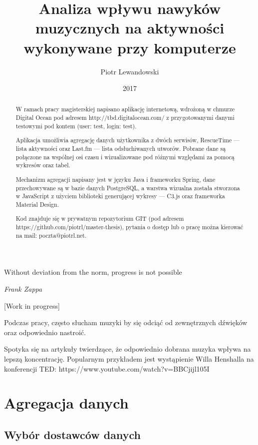 \documentclass[brudnopis]{xmgr}
\author   {Piotr Lewandowski}
\title    {Analiza wpływu nawyków muzycznych na aktywności wykonywane przy komputerze}
\date     {2017}
\begin{document}
\begin{abstract}
    W ramach pracy magisterskiej napisano aplikację internetową,
    wdrożoną w chmurze Digital Ocean pod adresem http://tbd.digitalocean.com/
    z przygotowanymi danymi testowymi pod kontem (user: test, login: test).

    Aplikacja umożliwia agregację danych użytkownika z dwóch serwisów,
    RescueTime — lista aktywności oraz
    Last.fm — lista odsłuchiwanych utworów.
    Pobrane dane są połączone na wspólnej osi czasu i wizualizowane pod różnymi względami za pomocą wykresów oraz tabel.

    Mechanizm agregacji napisany jest w języku Java i frameworku Spring,
    dane przechowywane są w bazie danych PostgreSQL,
    a warstwa wizualna została stworzona w JavaScript
    z użyciem biblioteki generującej wykresy — C3.js
    oraz frameworka Material Design.

    Kod znajduje się w prywatnym repozytorium GIT (pod adresem https://github.com/piotrl/master-thesis),
    pytania o dostęp lub o pracę można kierować na mail: poczta@piotrl.net.
\end{abstract}


\maketitle

\introduction

\epigraph{Without deviation from the norm, progress is not possible}{\textit{Frank Zappa}}

[Work in progress]

Podczas pracy, często słucham muzyki by się odciąć od zewnętrznych dźwięków oraz odpowiednio nastroić.

Spotyka się na artykuły twierdzące, że odpowiednio dobrana muzyka wpływa na lepszą koncentrację.
Popularnym przykładem jest wystąpienie Willa Henshalla na konferencji TED: https://www.youtube.com/watch?v=BBCjijl105I

\chapter{Agregacja danych}

    \section{Wybór dostawców danych}
\end{document}
